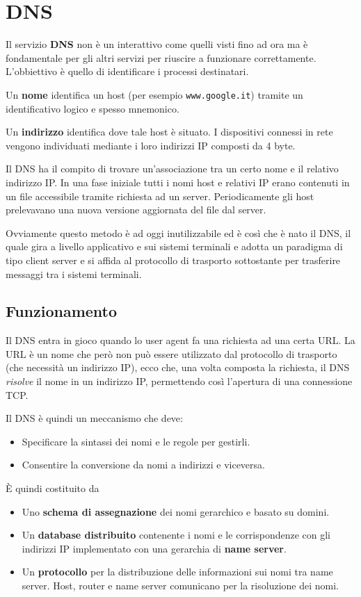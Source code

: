 \section{DNS}
Il servizio \textbf{DNS} non è un interattivo come quelli visti fino ad ora ma è fondamentale per
gli altri servizi per riuscire a funzionare correttamente. L'obbiettivo è quello di identificare i
processi destinatari.

Un \textbf{nome} identifica un host (per esempio \verb|www.google.it|) tramite un identificativo
logico e spesso mnemonico.

Un \textbf{indirizzo} identifica dove tale host è situato. I dispositivi connessi in rete vengono
individuati mediante i loro indirizzi IP composti da 4 byte.

Il DNS ha il compito di trovare un'associazione tra un certo nome e il relativo indirizzo IP. In
una fase iniziale tutti i nomi host e relativi IP erano contenuti in un file accessibile tramite
richiesta ad un server. Periodicamente gli host prelevavano una nuova versione aggiornata del file
dal server.

Ovviamente questo metodo è ad oggi inutilizzabile ed è così che è nato il DNS, il quale gira a
livello applicativo e sui sistemi terminali e adotta un paradigma di tipo client server e si affida
al protocollo di trasporto sottostante per trasferire messaggi tra i sistemi terminali.

\subsection{Funzionamento}
Il DNS entra in gioco quando lo user agent fa una richiesta ad una certa URL. La URL è un nome che
però non può essere utilizzato dal protocollo di trasporto (che necessità un indirizzo IP), ecco
che, una volta composta la richiesta, il DNS \emph{risolve} il nome in un indirizzo IP, permettendo
così l'apertura di una connessione TCP.

Il DNS è quindi un meccanismo che deve:
\begin{itemize}
	\item Specificare la sintassi dei nomi e le regole per gestirli.
	\item Consentire la conversione da nomi a indirizzi e viceversa.
\end{itemize}
\`E quindi costituito da
\begin{itemize}
	\item Uno \textbf{schema di assegnazione} dei nomi gerarchico e basato su domini.
	\item Un \textbf{database distribuito} contenente i nomi e le corrispondenze con gli indirizzi
	      IP implementato con una gerarchia di \textbf{name server}.
	\item Un \textbf{protocollo} per la distribuzione delle informazioni sui nomi tra name server.
	      Host, router e name server comunicano per la risoluzione dei nomi.
\end{itemize}

